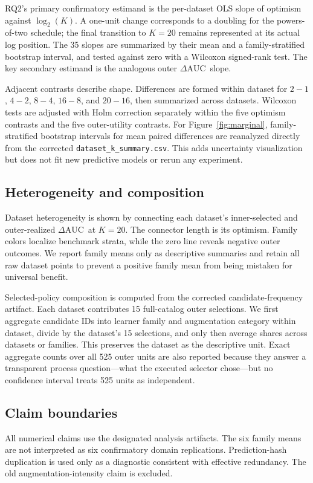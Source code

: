 \documentclass[referee]{USG}
\newcommand{\dauc}{\ensuremath{\Delta\mathrm{AUC}}}
\begin{document}
RQ2's primary confirmatory estimand is the per-dataset OLS slope of optimism against $\log_2(K)$. A one-unit change corresponds to a doubling for the powers-of-two schedule; the final transition to $K=20$ remains represented at its actual log position. The 35 slopes are summarized by their mean and a family-stratified bootstrap interval, and tested against zero with a Wilcoxon signed-rank test. The key secondary estimand is the analogous outer \dauc\ slope.

Adjacent contrasts describe shape. Differences are formed within dataset for $2-1$, $4-2$, $8-4$, $16-8$, and $20-16$, then summarized across datasets. Wilcoxon tests are adjusted with Holm correction separately within the five optimism contrasts and the five outer-utility contrasts. For Figure~\ref{fig:marginal}, family-stratified bootstrap intervals for mean paired differences are reanalyzed directly from the corrected \texttt{dataset\_k\_summary.csv}. This adds uncertainty visualization but does not fit new predictive models or rerun any experiment.

\subsection{Heterogeneity and composition}
Dataset heterogeneity is shown by connecting each dataset's inner-selected and outer-realized \dauc\ at $K=20$. The connector length is its optimism. Family colors localize benchmark strata, while the zero line reveals negative outer outcomes. We report family means only as descriptive summaries and retain all raw dataset points to prevent a positive family mean from being mistaken for universal benefit.

Selected-policy composition is computed from the corrected candidate-frequency artifact. Each dataset contributes 15 full-catalog outer selections. We first aggregate candidate IDs into learner family and augmentation category within dataset, divide by the dataset's 15 selections, and only then average shares across datasets or families. This preserves the dataset as the descriptive unit. Exact aggregate counts over all 525 outer units are also reported because they answer a transparent process question---what the executed selector chose---but no confidence interval treats 525 units as independent.

\subsection{Claim boundaries}
All numerical claims use the designated analysis artifacts. The six family means are not interpreted as six confirmatory domain replications. Prediction-hash duplication is used only as a diagnostic consistent with effective redundancy. The old augmentation-intensity claim is excluded.
\end{document}
